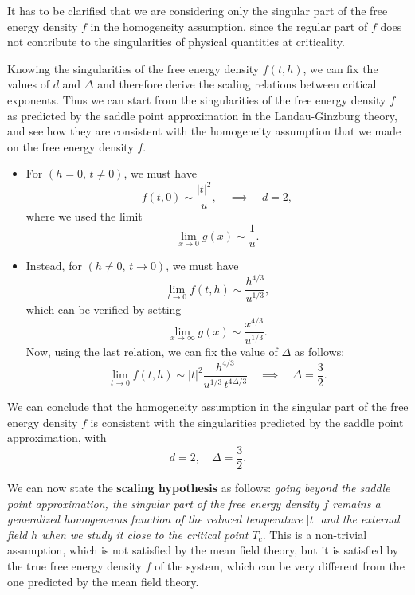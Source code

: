 \begin{remark}
    It has to be clarified that we are considering only the singular part of the free energy density \(f\) in the homogeneity assumption, since the regular part of \(f\) does not contribute to the singularities of physical quantities at criticality.
\end{remark}

Knowing the singularities of the free energy density \(f(t,h)\), we can fix the values of \(d\) and \(\Delta\) and therefore derive the scaling relations between critical exponents. Thus we can start from the singularities of the free energy density \(f\) as predicted by the saddle point approximation in the Landau-Ginzburg theory, and see how they are consistent with the homogeneity assumption that we made on the free energy density \(f\).
\begin{itemize}
    \item For \((h=0,\,t\neq 0)\), we must have
          \[
              f(t,0) \sim \frac{\vert t \vert^2}{u}, \quad \implies \quad d = 2,
          \]
          where we used the limit
          \[
              \lim_{x \to 0} g(x) \sim \frac{1}{u}.
          \]
    \item Instead, for \((h\neq 0,\,t \to 0)\), we must have
          \[
              \lim_{t \to 0} f(t,h) \sim \frac{h^{4/3}}{u^{1/3}},
          \]
          which can be verified by setting
          \[
              \lim_{x \to \infty} g(x) \sim \frac{x^{4/3}}{u^{1/3}}.
          \]
          Now, using the last relation, we can fix the value of \(\Delta\) as follows:
          \[
              \lim_{t \to 0} f(t,h) \sim \vert t \vert^2 \frac{h^{4/3}}{u^{1/3} \, t^{4\Delta/3}} \quad \implies \quad \Delta = \frac{3}{2}.
          \]
\end{itemize}
We can conclude that the homogeneity assumption in the singular part of the free energy density \(f\) is consistent with the singularities predicted by the saddle point approximation, with
\[
    d = 2, \quad \Delta = \frac{3}{2}.
\]

We can now state the \textbf{scaling hypothesis} as follows: \textit{going beyond the saddle point approximation, the singular part of the free energy density \(f\) remains a generalized homogeneous function of the reduced temperature \(\vert t \vert\) and the external field \(h\) when we study it close to the critical point \(T_c\)}. This is a non-trivial assumption, which is not satisfied by the mean field theory, but it is satisfied by the true free energy density \(f\) of the system, which can be very different from the one predicted by the mean field theory.

